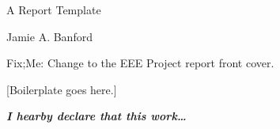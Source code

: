 \begin{titlepage}
\begin{RaggedRight}

\vspace*{2.2cm}

{\sffamily\huge A Report Template}

\par
\vspace{2cm}

{\sffamily\Large Jamie A. Banford}

\par
\vspace{6.5cm}

{\sffamily Fix;Me: Change to the EEE Project report front cover.}

\cleardoublepage


\vspace*{2.2cm}

[Boilerplate goes here.]

\textit{\textbf{I hearby declare that this work\ldots}}

\end{RaggedRight}
\end{titlepage}